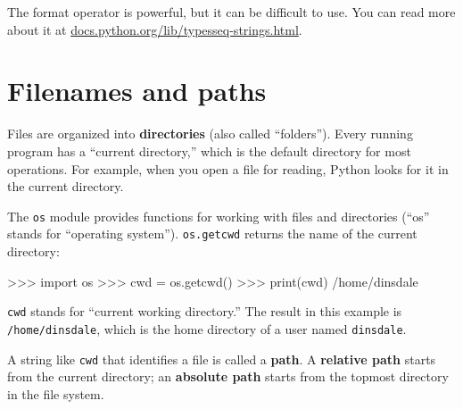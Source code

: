 The format operator is powerful, but it can be difficult to use.  You
can read more about it at
\url{docs.python.org/lib/typesseq-strings.html}.




\section{Filenames and paths}
\label{paths}


Files are organized into {\bf directories} (also called ``folders'').
Every running program has a ``current directory,'' which is the
default directory for most operations.  
For example, when you open a file for reading, Python looks for it in the
current directory.


The {\tt os} module provides functions for working with files and
directories (``os'' stands for ``operating system'').  {\tt os.getcwd}
returns the name of the current directory:


\beforeverb
\begin{pyinterpreter}
>>> import os
>>> cwd = os.getcwd()
>>> print(cwd)
/home/dinsdale
\end{pyinterpreter}
\afterverb
%
{\tt cwd} stands for ``current working directory.''  The result in
this example is {\tt /home/dinsdale}, which is the home directory of a
user named {\tt dinsdale}.


A string like {\tt cwd} that identifies a file is called a {\bf path}.
A {\bf relative path} starts from the current directory;
an {\bf absolute path} starts from the topmost directory in the
file system.


